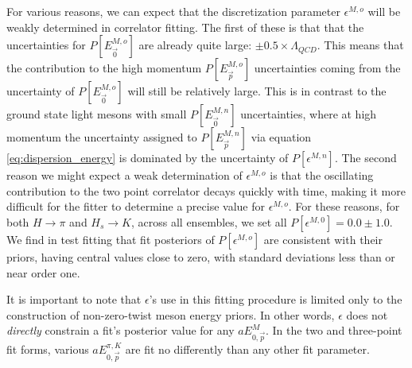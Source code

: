For various reasons, we can expect that the discretization parameter $\epsilon^{M,o}$ will be weakly determined in correlator fitting.  The first of these is that that the uncertainties for $P[E^{M,o}_{\vec{0}}]$ are already quite large: $\pm0.5\times\Lambda_{QCD}$.  This means that the contribution to the high momentum $P[E^{M,o}_{\vec{p}}]$ uncertainties coming from the uncertainty of $P[E^{M,o}_{\vec{0}}]$ will still be relatively large.  This is in contrast to the ground state light mesons with small $P[E^{M,n}_{\vec{0}}]$ uncertainties, where at high momentum the uncertainty assigned to $P[E^{M,n}_{\vec{p}}]$ via equation \ref{eq:dispersion_energy} is dominated by the uncertainty of $P[\epsilon^{M,n}]$.  The second reason we might expect a weak determination of $\epsilon^{M,o}$ is that the oscillating contribution to the two point correlator decays quickly with time, making it more difficult for the fitter to determine a precise value for $\epsilon^{M,o}$.  For these reasons, for both $H\rightarrow\pi$ and $H_s\rightarrow K$, across all ensembles, we set all $P[\epsilon^{M,0}]=0.0\pm1.0$.  We find in test fitting that fit posteriors of $P[\epsilon^{M,o}]$ are consistent with their priors, having central values close to zero, with standard deviations less than or near order one.

It is important to note that $\epsilon$'s use in this fitting procedure is limited only to the construction of non-zero-twist meson energy priors.  In other words, $\epsilon$ does not \textit{directly} constrain a fit's posterior value for any $aE^M_{0,\overrightarrow{p}}$.  In the two and three-point fit forms, various $aE^{\pi,K}_{0,\overrightarrow{p}}$ are fit no differently than any other fit parameter. 

